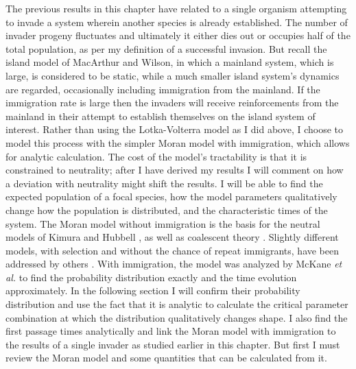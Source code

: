 The previous results in this chapter have related to a single organism attempting to invade a system wherein another species is already established. 
The number of invader progeny fluctuates and ultimately it either dies out or occupies half of the total population, as per my definition of a successful invasion. 
But recall the island model of MacArthur and Wilson, in which a mainland system, which is large, is considered to be static, while a much smaller island system's dynamics are regarded, occasionally including immigration from the mainland. 
If the immigration rate is large then the invaders will receive reinforcements from the mainland in their attempt to establish themselves on the island system of interest. 
Rather than using the Lotka-Volterra model as I did above, I choose to model this process with the simpler Moran model with immigration, which allows for analytic calculation. 
The cost of the model's tractability is that it is constrained to neutrality; after I have derived my results I will comment on how a deviation with neutrality might shift the results. 
I will be able to find the expected population of a focal species, how the model parameters qualitatively change how the population is distributed, and the characteristic times of the system. 
The Moran model without immigration is the basis for the neutral models of Kimura \cite{Kimura1956,Patwa2008,Houchmandzadeh2011} and Hubbell \cite{Bell2000,Hubbell2001}, as well as coalescent theory \cite{Kingman1982,Blythe2007,Etheridge2010}. 
Slightly different models, with selection and without the chance of repeat immigrants, have been addressed by others \cite{Taylor2004,Claussen2005,Lambert2006,Blythe2007,Parsons2007,Pigolotti2013,Chalub2016,Czuppon2017}. 
With immigration, the model was analyzed by McKane \emph{et al.} \cite{McKane2004} to find the probability distribution exactly and the time evolution approximately. 
In the following section I will confirm their probability distribution and use the fact that it is analytic to calculate the critical parameter combination at which the distribution qualitatively changes shape. 
I also find the first passage times analytically and link the Moran model with immigration to the results of a single invader as studied earlier in this chapter. 
But first I must review the Moran model and some quantities that can be calculated from it. 

